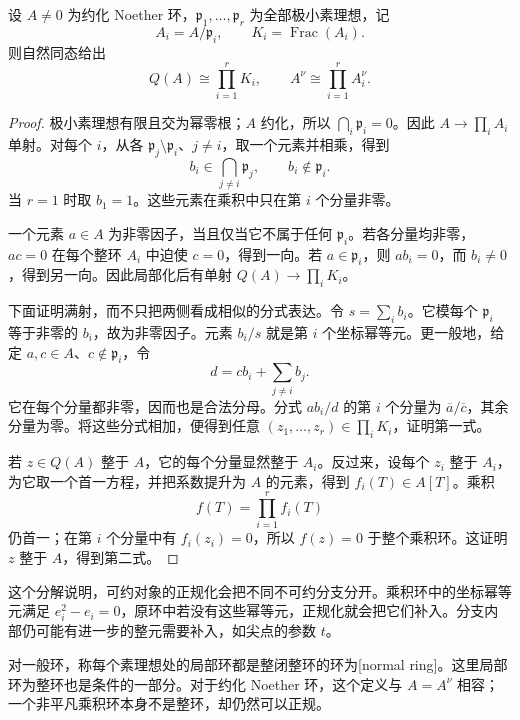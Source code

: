 \begin{proposition}\label{g5:prop:total-quotient-components}
	设 \(A\ne0\) 为约化 Noether 环，\(\mathfrak p_1,\ldots,\mathfrak p_r\) 为全部极小素理想，记
	\[
		A_i=A/\mathfrak p_i,\qquad K_i=\operatorname{Frac}(A_i).
	\]
	则自然同态给出
	\[
		Q(A)\cong\prod_{i=1}^r K_i,
		\qquad
		A^\nu\cong\prod_{i=1}^r A_i^\nu.
	\]
\end{proposition}
\begin{proof}
	极小素理想有限且交为幂零根；\(A\) 约化，所以 \(\bigcap_i\mathfrak p_i=0\)。因此 \(A\to\prod_i A_i\) 单射。对每个 \(i\)，从各 \(\mathfrak p_j\setminus\mathfrak p_i\)、\(j\ne i\)，取一个元素并相乘，得到
	\[
		b_i\in\bigcap_{j\ne i}\mathfrak p_j,\qquad b_i\notin\mathfrak p_i.
	\]
	当 \(r=1\) 时取 \(b_1=1\)。这些元素在乘积中只在第 \(i\) 个分量非零。

	一个元素 \(a\in A\) 为非零因子，当且仅当它不属于任何 \(\mathfrak p_i\)。若各分量均非零，\(ac=0\) 在每个整环 \(A_i\) 中迫使 \(c=0\)，得到一向。若 \(a\in\mathfrak p_i\)，则 \(ab_i=0\)，而 \(b_i\ne0\)，得到另一向。因此局部化后有单射 \(Q(A)\to\prod_i K_i\)。

	下面证明满射，而不只把两侧看成相似的分式表达。令 \(s=\sum_i b_i\)。它模每个 \(\mathfrak p_i\) 等于非零的 \(b_i\)，故为非零因子。元素 \(b_i/s\) 就是第 \(i\) 个坐标幂等元。更一般地，给定 \(a,c\in A\)、\(c\notin\mathfrak p_i\)，令
	\[
		d=cb_i+\sum_{j\ne i}b_j.
	\]
	它在每个分量都非零，因而也是合法分母。分式 \(ab_i/d\) 的第 \(i\) 个分量为 \(\overline a/\overline c\)，其余分量为零。将这些分式相加，便得到任意 \((z_1,\ldots,z_r)\in\prod_i K_i\)，证明第一式。

	若 \(z\in Q(A)\) 整于 \(A\)，它的每个分量显然整于 \(A_i\)。反过来，设每个 \(z_i\) 整于 \(A_i\)，为它取一个首一方程，并把系数提升为 \(A\) 的元素，得到 \(f_i(T)\in A[T]\)。乘积
	\[
		f(T)=\prod_{i=1}^r f_i(T)
	\]
	仍首一；在第 \(i\) 个分量中有 \(f_i(z_i)=0\)，所以 \(f(z)=0\) 于整个乘积环。这证明 \(z\) 整于 \(A\)，得到第二式。
\end{proof}

这个分解说明，可约对象的正规化会把不同不可约分支分开。乘积环中的坐标幂等元满足 \(e_i^2-e_i=0\)，原环中若没有这些幂等元，正规化就会把它们补入。分支内部仍可能有进一步的整元需要补入，如尖点的参数 \(t\)。

\ProseParagraphBreak

对一般环，称每个素理想处的局部环都是整闭整环的环为[normal ring]。这里局部环为整环也是条件的一部分。对于约化 Noether 环，这个定义与 \(A=A^\nu\) 相容；一个非平凡乘积环本身不是整环，却仍然可以正规。

